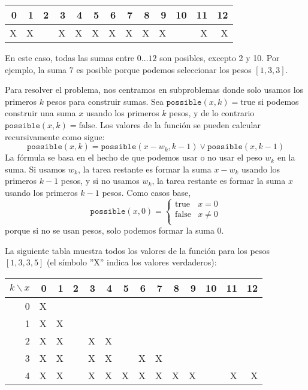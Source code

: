 \begin{center}
\begin{tabular}{rrrrrrrrrrrrr}
 0 & 1 & 2 & 3 & 4 & 5 & 6 & 7 & 8 & 9 & 10 & 11 & 12 \\
\hline
 X & X & & X & X & X & X & X & X & X & & X & X \\
\end{tabular}
\end{center}

En este caso, todas las sumas entre $0 \ldots 12$
son posibles, excepto 2 y 10.
Por ejemplo, la suma 7 es posible porque
podemos seleccionar los pesos $[1,3,3]$.


Para resolver el problema, nos centramos en subproblemas
donde solo usamos los primeros $k$ pesos
para construir sumas.
Sea $\texttt{possible}(x,k)=\textrm{true}$ si
podemos construir una suma $x$
usando los primeros $k$ pesos,
y de lo contrario $\texttt{possible}(x,k)=\textrm{false}$.
Los valores de la función se pueden calcular recursivamente
como sigue:
\[ \texttt{possible}(x,k) = \texttt{possible}(x-w_k,k-1) \lor \texttt{possible}(x,k-1) \]
La fórmula se basa en el hecho de que podemos
usar o no usar el peso $w_k$ en la suma.
Si usamos $w_k$, la tarea restante es
formar la suma $x-w_k$ usando los primeros $k-1$ pesos,
y si no usamos $w_k$,
la tarea restante es formar la suma $x$
usando los primeros $k-1$ pesos.
Como casos base,
\begin{equation*}
    \texttt{possible}(x,0) = \begin{cases}
               \textrm{true}    & x = 0\\
               \textrm{false}   & x \neq 0 \\
           \end{cases}
\end{equation*}
porque si no se usan pesos,
solo podemos formar la suma 0.

La siguiente tabla muestra todos los valores de la función
para los pesos $[1,3,3,5]$ (el símbolo ''X''
indica los valores verdaderos):

\begin{center}
\begin{tabular}{r|rrrrrrrrrrrrr}
$k \backslash x$ & 0 & 1 & 2 & 3 & 4 & 5 & 6 & 7 & 8 & 9 & 10 & 11 & 12 \\
\hline
 0 & X & \\
 1 & X & X \\
 2 & X & X & & X & X \\
 3 & X & X & & X & X & & X & X \\
 4 & X & X & & X & X & X & X & X & X & X & & X & X \\
\end{tabular}
\end{center}

